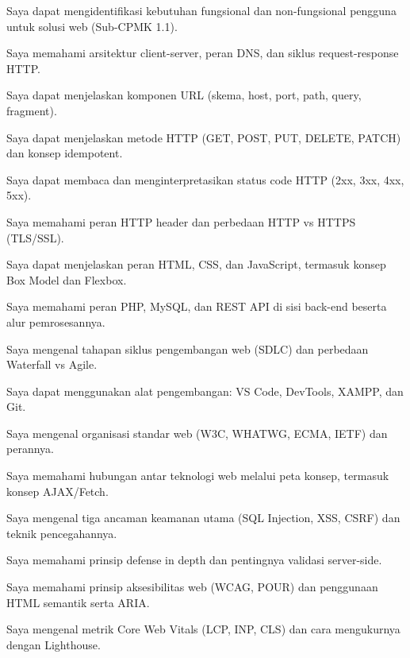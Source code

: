 \documentclass[../main.tex]{subfiles}
\begin{document}
\begin{checklist}
  \item Saya dapat mengidentifikasi kebutuhan fungsional dan non-fungsional pengguna untuk solusi web (Sub-CPMK 1.1).
  \item Saya memahami arsitektur client-server, peran DNS, dan siklus request-response HTTP.
  \item Saya dapat menjelaskan komponen URL (skema, host, port, path, query, fragment).
  \item Saya dapat menjelaskan metode HTTP (GET, POST, PUT, DELETE, PATCH) dan konsep idempotent.
  \item Saya dapat membaca dan menginterpretasikan status code HTTP (2xx, 3xx, 4xx, 5xx).
  \item Saya memahami peran HTTP header dan perbedaan HTTP vs HTTPS (TLS/SSL).
  \item Saya dapat menjelaskan peran HTML, CSS, dan JavaScript, termasuk konsep Box Model dan Flexbox.
  \item Saya memahami peran PHP, MySQL, dan REST API di sisi back-end beserta alur pemrosesannya.
  \item Saya mengenal tahapan siklus pengembangan web (SDLC) dan perbedaan Waterfall vs Agile.
  \item Saya dapat menggunakan alat pengembangan: VS Code, DevTools, XAMPP, dan Git.
  \item Saya mengenal organisasi standar web (W3C, WHATWG, ECMA, IETF) dan perannya.
  \item Saya memahami hubungan antar teknologi web melalui peta konsep, termasuk konsep AJAX/Fetch.
  \item Saya mengenal tiga ancaman keamanan utama (SQL Injection, XSS, CSRF) dan teknik pencegahannya.
  \item Saya memahami prinsip defense in depth dan pentingnya validasi server-side.
  \item Saya memahami prinsip aksesibilitas web (WCAG, POUR) dan penggunaan HTML semantik serta ARIA.
  \item Saya mengenal metrik Core Web Vitals (LCP, INP, CLS) dan cara mengukurnya dengan Lighthouse.
\end{checklist}
\end{document}
